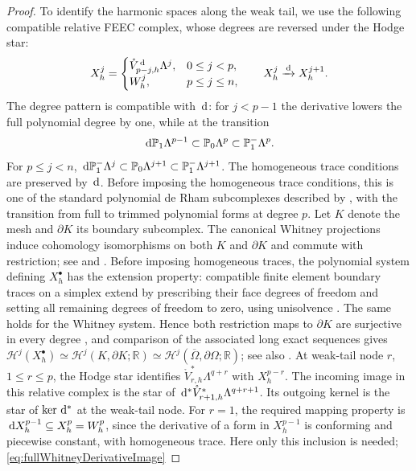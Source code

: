 \documentclass[10pt]{amsart}
\numberwithin{equation}{section}
\newcommand{\dd}{\,{\rm d}}
\begin{document}
\begin{proof}
To identify the harmonic spaces along the weak tail, we use the following
compatible relative FEEC complex, whose degrees are reversed under the
Hodge star:
\[
X_h^j=
\begin{cases}
\mathring V_{p-j,h}^{\dd}\Lambda^j,&0\leq j<p,\\
W_h^j,&p\leq j\leq n,
\end{cases}
\qquad X_h^j\xrightarrow{\dd}X_h^{j+1}.
\]
The degree pattern is compatible with $\dd$: for $j<p-1$ the derivative
lowers the full polynomial degree by one, while at the transition
\[
\dd\mathbb P_1\Lambda^{p-1}\subset\mathbb P_0\Lambda^p
\subset\mathbb P_1^-\Lambda^p.
\]
For $p\leq j<n$,
$\dd\mathbb P_1^-\Lambda^j\subset\mathbb P_0\Lambda^{j+1}
\subset\mathbb P_1^-\Lambda^{j+1}$.
The homogeneous trace conditions are preserved by $\dd$.
Before imposing the homogeneous trace conditions, this is one of the
standard polynomial de Rham subcomplexes described by
\cite[Section 5.2, (73)]{ArnoldFalkWinther2010}, with the transition
from full to trimmed polynomial forms at degree $p$.
Let $K$ denote the mesh and $\partial K$ its boundary subcomplex.
The canonical Whitney projections induce cohomology isomorphisms on both
$K$ and $\partial K$ and commute with restriction; see
\cite[Section 5.6]{ArnoldFalkWinther2010} and
\cite[Theorem 2]{ChristiansenHu2023}.
Before imposing homogeneous traces, the polynomial system defining
$X_h^\bullet$ has the extension property: compatible finite element
boundary traces on a simplex extend by prescribing their face degrees
of freedom and setting all remaining degrees of freedom to zero,
using unisolvence \cite[Theorem~5.5]{ArnoldFalkWinther2010}.
The same holds for the Whitney system. Hence both restriction maps
to $\partial K$ are surjective in every degree
\cite[Proposition~2]{ChristiansenHu2023}, and comparison of the associated
long exact sequences gives
$\mathscr H^j(X_h^\bullet)\simeq \mathscr H^j(K,\partial K;\mathbb R)
\simeq \mathscr H^j(\overline\Omega,\partial\Omega;\mathbb R)$; see also
\cite[Section 6.2]{ArnoldFalkWinther2010}.
At weak-tail node $r$, $1\leq r\leq p$, the Hodge star identifies
$\mathring V_{r,h}^{*}\Lambda^{q+r}$ with $X_h^{p-r}$.
The incoming image in this relative complex is the star of
$\dd^*\mathring V_{r+1,h}^{*}\Lambda^{q+r+1}$.
Its outgoing kernel is the star of $\ker\dd^*$ at the weak-tail node.
For $r=1$, the required mapping property is
$\dd X_h^{p-1}\subseteq X_h^p=W_h^p$, since the derivative of a form in
$X_h^{p-1}$ is conforming and piecewise constant, with homogeneous trace.
Here only this inclusion is needed; \eqref{eq:fullWhitneyDerivativeImage}

\end{proof}
\end{document}
